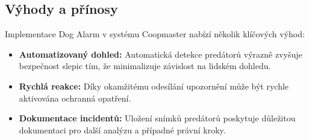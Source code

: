 \subsection*{Výhody a přínosy}

Implementace Dog Alarm v systému Coopmaster nabízí několik klíčových výhod:
\begin{itemize}
    \item \textbf{Automatizovaný dohled:} Automatická detekce predátorů výrazně zvyšuje bezpečnost slepic tím, že minimalizuje závislost na lidském dohledu.
    \item \textbf{Rychlá reakce:} Díky okamžitému odesílání upozornění může být rychle aktivována ochranná opatření.
    \item \textbf{Dokumentace incidentů:} Uložení snímků predátorů poskytuje důležitou dokumentaci pro další analýzu a případné právní kroky.
\end{itemize}

